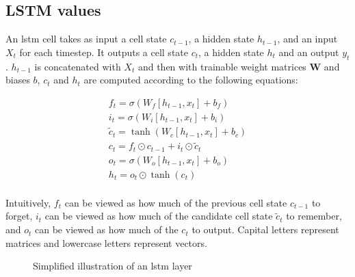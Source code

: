 \documentclass[UKenglish]{uiomasterthesis}
\begin{document}
\subsection{LSTM values}
An \ac{lstm} cell takes as input a cell state $c_{t-1}$, a hidden state $h_{t-1}$, and an input $X_t$ for each timestep. It outputs a cell state $c_{t}$, a hidden state $h_{t}$ and an output $y_t$. $h_{t-1}$ is concatenated with $X_t$ and then with trainable weight matrices $\textbf{W}$ and biases $b$, $c_t$ and $h_t$ are computed according to the following equations:

\begin{gather*}
f_t = \sigma(W_f [h_{t-1}, x_t] + b_f)\\
i_t = \sigma(W_i [h_{t-1}, x_t] + b_i)\\
\tilde{c}_t = \tanh(W_c [h_{t-1}, x_t] + b_c)\\
c_t = f_t \odot c_{t-1} + i_t \odot \tilde{c}_t\\
o_t = \sigma(W_o [h_{t-1}, x_t] + b_o)\\
h_t = o_t \odot \tanh(c_t)\\
\end{gather*}

Intuitively, $f_t$ can be viewed as how much of the previous cell state $c_{t-1}$ to forget, $i_t$ can be viewed as how much of the candidate cell state $\tilde{c}_t$ to remember, and $o_t$ can be viewed as how much of the $c_{t}$ to output. Capital letters represent matrices and lowercase letters represent vectors.

\begin{figure}[hbtp]
\centering
{}
\caption{Simplified illustration of an \ac{lstm} layer}
\label{fig:lstm}
\end{figure}
\end{document}
